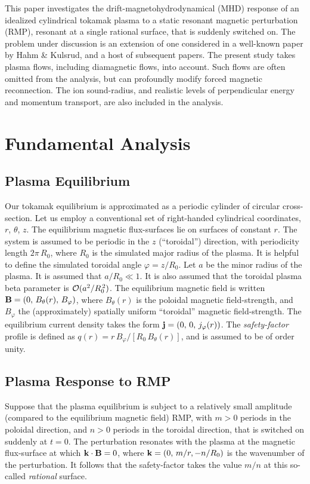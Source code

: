 \documentclass[12pt,prb,aps]{revtex4-1}
\begin{document}
This paper  investigates the drift-magnetohydrodynamical (MHD) response of an idealized cylindrical  tokamak plasma to a static resonant magnetic
perturbation (RMP),  resonant at a single rational surface,  that is suddenly switched on. The problem under discussion is an extension of one considered in a well-known paper by
Hahm \& Kulsrud,\cite{hk} and a host of subsequent papers.\cite{wb,rf1,rfb,rfc,rf2,rfd,com,hz} The present study takes
plasma flows, including diamagnetic flows, into account. Such flows are often omitted from the analysis, but can profoundly modify forced magnetic reconnection. 
The ion sound-radius, and realistic levels of perpendicular energy and momentum transport, are also included in the analysis. 

\section{Fundamental Analysis}

\subsection{Plasma Equilibrium}\label{s2a}
Our tokamak equilibrium is approximated as a periodic cylinder of circular cross-section.\cite{ric3}
Let us employ a conventional set of right-handed cylindrical coordinates, $r$, $\theta$, $z$. The
equilibrium magnetic flux-surfaces lie on surfaces of constant $r$. The system is
assumed to be periodic in the $z$ (``toroidal'') direction, with periodicity length $2\pi\,R_0$, 
where $R_0$ is the simulated  major radius of the plasma. It is helpful to define the simulated toroidal angle $\varphi=z/R_0$. Let $a$ be the minor radius of the plasma. It is assumed that $a/R_0\ll 1$. It is also assumed that the
toroidal plasma beta parameter is ${\cal O}(a^2/R_0^{\,2})$.\cite{ric3}  The equilibrium magnetic
field is written 
${\bf B} = (0,\,B_\theta(r),\, B_\varphi)$, 
  where $B_\theta(r)$ 
is the poloidal magnetic field-strength, and $B_\varphi$  the (approximately) spatially uniform  ``toroidal'' magnetic field-strength.  
The equilibrium current density takes the form
${\bf j} =(0,\,0,\,j_\varphi(r))$. The {\em safety-factor} profile is defined as 
$q(r) = r\,B_\varphi/[R_0\,B_\theta(r)]$, and is assumed to be of order unity.

\subsection{Plasma Response to RMP}
Suppose that the plasma equilibrium is subject to a relatively small amplitude (compared to  the equilibrium magnetic field) RMP, with $m>0$ periods in the poloidal direction, and $n>0$ periods in the
toroidal direction, that is switched on suddenly at $t=0$. The perturbation resonates with the plasma at the magnetic flux-surface at which ${\bf k}\cdot{\bf B}=0$, where ${\bf k}=(0,\,m/r,-n/R_0)$ is the wavenumber of the perturbation. It follows that the safety-factor
takes the value $m/n$ at this so-called {\em rational}\/ surface.  
\end{document}
